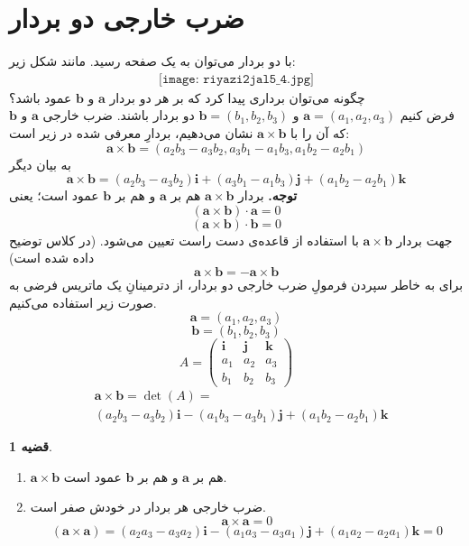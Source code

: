 \documentclass[12pt,a4paper]{article}
\theoremstyle{definition}
\newtheorem{thm}{قضیه}
\begin{document}
\section*{ضرب خارجی دو بردار}
با دو بردار می‌توان به یک صفحه رسید. مانند شکل زیر:
\begin{align*}
\texttt{[image: riyazi2jal5\_4.jpg]}
\end{align*}
چگونه می‌توان برداری پیدا کرد که بر هر دو بردار 
$\mathbf{a}$
و
$\mathbf{b}$
عمود باشد؟
\\
فرض کنیم 
$\mathbf{a}=(a_1,a_2,a_3)$
و
$\mathbf{b}=(b_1,b_2,b_3)$
دو بردار باشند.
ضرب خارجی 
$\mathbf{a}$
و
$\mathbf{b}$
که آن را با 
$\mathbf{a} \times \mathbf{b}$
نشان می‌دهیم، بردارِ معرفی شده در زیر است:
\[
\mathbf{a} \times \mathbf{b}=(a_2b_3-a_3b_2,a_3b_1-a_1b_3,a_1b_2-a_2b_1)
\]
به بیان دیگر
\[
\mathbf{a} \times \mathbf{b}=(a_2b_3-a_3b_2)\mathbf{i}+(a_3b_1-a_1b_3)\mathbf{j}+(a_1b_2-a_2b_1)\mathbf{k}
\]
\textbf{توجه.}
بردار 
$\mathbf{a} \times \mathbf{b}$
هم بر 
$\mathbf{a}$
و هم بر 
$\mathbf{b}$
عمود است؛ یعنی
\[
(\mathbf{a} \times \mathbf{b})\cdot \mathbf{a} =0
\]
\[
(\mathbf{a} \times \mathbf{b})\cdot \mathbf{b} =0
\]
جهت بردار
$\mathbf{a} \times \mathbf{b}$
با استفاده از قاعده‌ی دست راست تعیین می‌شود. (در کلاس توضیح داده شده است)
\[
\mathbf{a} \times \mathbf{b}=-\mathbf{a} \times \mathbf{b}
\]
برای به خاطر سپردن فرمولِ ضرب خارجی دو بردار، از دترمینانِ یک ماتریس فرضی به صورت زیر استفاده می‌کنیم. 
\[
\mathbf{a}=(a_1,a_2,a_3)
\]
\[
\mathbf{b}=(b_1,b_2,b_3)
\]
\[
A=\left(\begin{array}{ccc}
\mathbf{i} & \mathbf{j} & \mathbf{k} \\
a_1 & a_2 & a_3 \\
b_1 & b_2 & b_3 
\end{array}
\right)
\]
\begin{align*}
&
\mathbf{a} \times \mathbf{b}=\det (A)=
\\
& (a_2b_3-a_3b_2)\mathbf{i}-(a_1b_3-a_3b_1)\mathbf{j}+(a_1b_2-a_2b_1)\mathbf{k}
\end{align*}
\begin{thm}
\begin{enumerate}\hfill
\item
$\mathbf{a} \times \mathbf{b}$
هم بر 
$\mathbf{a}$
و هم بر 
$\mathbf{b}$
عمود است.
\item
ضرب خارجی هر بردار در خودش صفر است.
\[
\mathbf{a} \times \mathbf{a}=0
\]
\[
 (\mathbf{a} \times \mathbf{a})=(a_2a_3-a_3a_2)\mathbf{i}-(a_1a_3-a_3a_1)\mathbf{j}+(a_1a_2-a_2a_1)\mathbf{k}=0
\]
\end{enumerate}
\end{thm}
\end{document}
